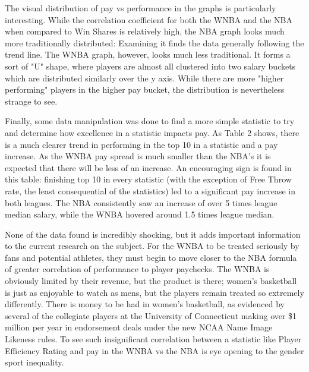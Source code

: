 \documentclass[12pt]{article}
\begin{document}
The visual distribution of pay vs performance in the graphs is particularly interesting. While the correlation coefficient for both the WNBA and the NBA 
when compared to Win Shares is relatively high, the NBA graph looks much more traditionally distributed: Examining it finds the data generally following 
the trend line. The WNBA graph, however, looks much less traditional. It forms a sort of "U" shape, where players are almost all clustered into two salary 
buckets which are distributed similarly over the y axis. While there are more "higher performing" players in the higher pay bucket, the distribution is 
nevertheless strange to see.
\par
Finally, some data manipulation was done to find a more simple statistic to try and determine how excellence in a statistic impacts pay. As Table 2 shows, 
there is a much clearer trend in performing in the top 10 in a statistic and a pay increase. As the WNBA pay spread is much smaller than the NBA’s it is 
expected that there will be less of an increase. An encouraging sign is found in this table: finishing top 10 in every statistic (with the exception of 
Free Throw rate, the least consequential of the statistics) led to a significant pay increase in both leagues. The NBA consistently saw an increase of 
over 5 times league median salary, while the WNBA hovered around 1.5 times league median.
\par
None of the data found is incredibly shocking, but it adds important information to the current research on the subject. For the WNBA to be treated 
seriously by fans and potential athletes, they must begin to move closer to the NBA formula of greater correlation of performance to player paychecks. The 
WNBA is obviously limited by their revenue, but the product is there; women’s basketball is just as enjoyable to watch as mens, but the players remain 
treated so extremely differently. There is money to be had in women’s basketball, as evidenced by several of the collegiate players at the University of 
Connecticut making over \$1 million per year in endorsement deals under the new NCAA Name Image Likeness rules. To see such insignificant correlation 
between a statistic like Player Efficiency Rating and pay in the WNBA vs the NBA is eye opening to the gender sport inequality.
\end{document}
